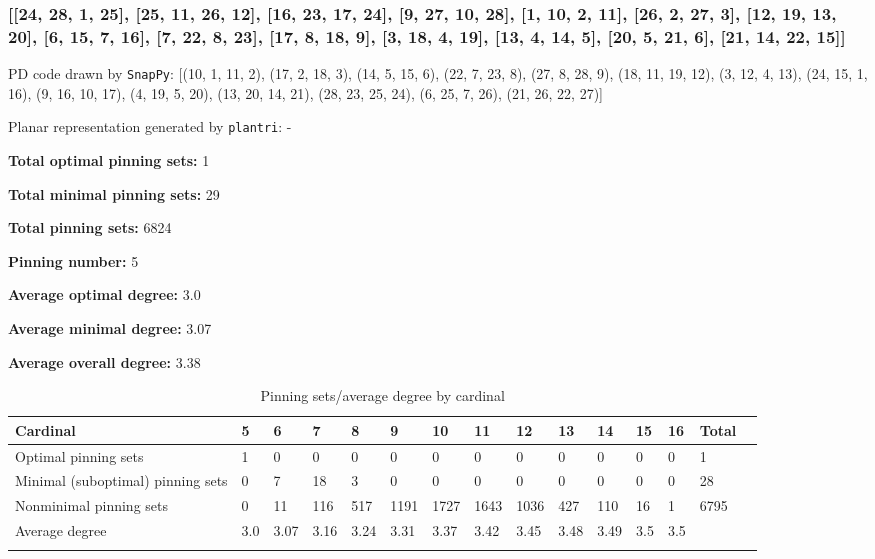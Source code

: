 \documentclass{article}%
\begin{document}
\newpage

\subsubsection{[[24, 28, 1, 25], [25, 11, 26, 12], [16, 23, 17, 24], [9, 27, 10, 28], [1, 10, 2, 11], [26, 2, 27, 3], [12, 19, 13, 20], [6, 15, 7, 16], [7, 22, 8, 23], [17, 8, 18, 9], [3, 18, 4, 19], [13, 4, 14, 5], [20, 5, 21, 6], [21, 14, 22, 15]]}

{\small\noindent PD code drawn by \texttt{SnapPy}: [(10, 1, 11, 2), (17, 2, 18, 3), (14, 5, 15, 6), (22, 7, 23, 8), (27, 8, 28, 9), (18, 11, 19, 12), (3, 12, 4, 13), (24, 15, 1, 16), (9, 16, 10, 17), (4, 19, 5, 20), (13, 20, 14, 21), (28, 23, 25, 24), (6, 25, 7, 26), (21, 26, 22, 27)]}

{\small\noindent Planar representation generated by \texttt{plantri}: -}

\begin{multicols}{2}
{\normalsize \noindent\textbf{Total optimal pinning sets:} 1

\noindent\textbf{Total minimal pinning sets:} 29

\noindent\textbf{Total pinning sets:} 6824

\noindent\textbf{Pinning number:} 5

}
\columnbreak

{\normalsize \noindent\textbf{Average optimal degree:} 3.0

\noindent\textbf{Average minimal degree:} 3.07

\noindent\textbf{Average overall degree:} 3.38

}
\end{multicols}

\begin{table}[ht]
	\caption{Pinning sets/average degree by cardinal}
	\centering
	\renewcommand{\arraystretch}{1.5}
	\begin{tabularx}{\textwidth}{lXXXXXXXXXXXXXX}
		\toprule
			Cardinal & 5 & 6 & 7 & 8 & 9 & 10 & 11 & 12 & 13 & 14 & 15 & 16 & Total\\
			\hline
			Optimal pinning sets & 1 & 0 & 0 & 0 & 0 & 0 & 0 & 0 & 0 & 0 & 0 & 0 & 1 \\
			Minimal (suboptimal) pinning sets & 0 & 7 & 18 & 3 & 0 & 0 & 0 & 0 & 0 & 0 & 0 & 0 & 28 \\
			Nonminimal pinning sets & 0 & 11 & 116 & 517 & 1191 & 1727 & 1643 & 1036 & 427 & 110 & 16 & 1 & 6795 \\
			Average degree & 3.0 & 3.07 & 3.16 & 3.24 & 3.31 & 3.37 & 3.42 & 3.45 & 3.48 & 3.49 & 3.5 & 3.5 &  \\
		\bottomrule \\ 
	\end{tabularx}
\end{table}
\end{document}
